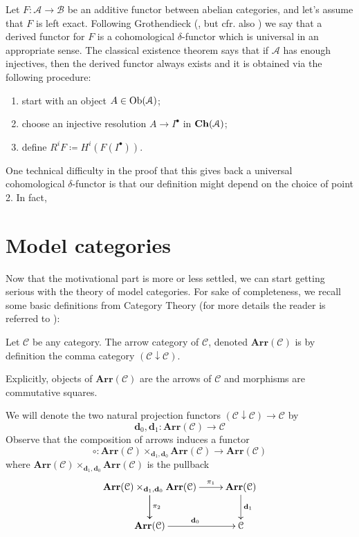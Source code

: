 \begin{refsection}
Let $F \colon \mathcal A \to \mathcal B$ be an additive functor between abelian categories, and let's assume that $F$ is left exact. Following Grothendieck (\cite{tohoku}, but cfr. also \cite[Ch. II]{weibel}) we say that a derived functor for $F$ is a cohomological $\delta$-functor which is universal in an appropriate sense. The classical existence theorem says that if $\mathcal A$ has enough injectives, then the derived functor always exists and it is obtained via the following procedure:
\begin{enumerate}
\item start with an object $A \in \operatorname{Ob}(\mathcal A)$;
\item choose an injective resolution $A \to I^\bullet$ in $\mathbf{Ch}(\mathcal A)$;
\item define $R^i F\coloneqq H^i(F(I^\bullet))$.
\end{enumerate}
One technical difficulty in the proof that this gives back a universal cohomological $\delta$-functor is that our definition might depend on the choice of point 2. In fact, 

\section{Model categories}

Now that the motivational part is more or less settled, we can start getting serious with the theory of model categories. For sake of completeness, we recall some basic definitions from Category Theory (for more details the reader is referred to \cite{cwm}):

\begin{defin}
Let $\mathcal C$ be any category. The arrow category of $\mathcal C$, denoted $\mathbf{Arr}(\mathcal C)$ is by definition the comma category $(\mathcal C \downarrow \mathcal C)$.
\end{defin}

\begin{rmk}
Explicitly, objects of $\mathbf{Arr}(\mathcal C)$ are the arrows of $\mathcal C$ and morphisms are commutative squares.
\end{rmk}

\begin{rmk}
We will denote the two natural projection functors $(\mathcal C \downarrow \mathcal C) \to \mathcal C$ by
\[
\mathbf d_0, \mathbf d_1 \colon \mathbf{Arr}(\mathcal C) \to \mathcal C
\]
Observe that the composition of arrows induces a functor
\[
\circ \colon \mathbf{Arr}(\mathcal C) \times_{\mathbf d_1, \mathbf d_0} \mathbf{Arr}(\mathcal C) \to \mathbf{Arr}(\mathcal C)
\]
where $\mathbf{Arr}(\mathcal C) \times_{\mathbf d_1, \mathbf d_0} \mathbf{Arr}(\mathcal C)$ is the pullback
\[
\xymatrix{
\mathbf{Arr}(\mathcal C) \times_{\mathbf d_1, \mathbf d_0} \mathbf{Arr}(\mathcal C) \ar[d] \ar[r]^-{\pi_1} \ar[d]^{\pi_2} & \mathbf{Arr}(\mathcal C) \ar[d]^{\mathbf d_1} \\ \mathbf{Arr}(\mathcal C) \ar[r]^{\mathbf d_0} & \mathcal C
}
\]
\end{rmk}


\end{refsection}
